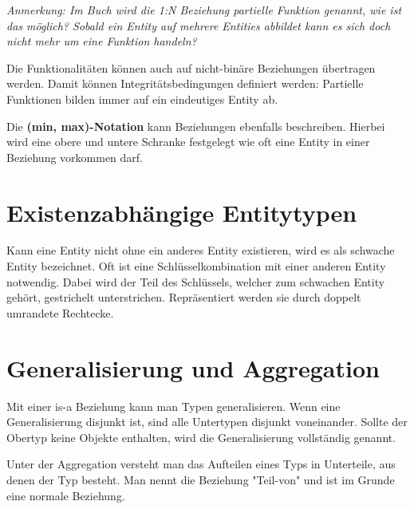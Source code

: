 \documentclass[a4paper, oneside]{book}
\begin{document}
  \textit{Anmerkung: Im Buch wird die 1:N Beziehung partielle Funktion genannt, wie ist das möglich?
  Sobald ein Entity auf mehrere Entities abbildet kann es sich doch nicht mehr um eine Funktion handeln?}

  Die Funktionalitäten können auch auf nicht-binäre Beziehungen übertragen werden. Damit können Integritätsbedingungen definiert werden:
  Partielle Funktionen bilden immer auf ein eindeutiges Entity ab.

  Die \textbf{(min, max)-Notation} kann Beziehungen ebenfalls beschreiben.
  Hierbei wird eine obere und untere Schranke festgelegt wie oft eine Entity in einer Beziehung vorkommen darf.
  
  \section{Existenzabhängige Entitytypen}
  Kann eine Entity nicht ohne ein anderes Entity existieren, wird es als schwache Entity bezeichnet.
  Oft ist eine Schlüsselkombination mit einer anderen Entity notwendig. Dabei wird der Teil des Schlüssels, welcher zum schwachen Entity gehört, 
  gestrichelt unterstrichen. Repräsentiert werden sie durch doppelt umrandete Rechtecke.

  \section{Generalisierung und Aggregation}
  Mit einer is-a Beziehung kann man Typen generalisieren. Wenn eine Generalisierung disjunkt ist, sind alle Untertypen disjunkt voneinander. 
  Sollte der Obertyp keine Objekte enthalten, wird die Generalisierung vollständig genannt.

  Unter der Aggregation versteht man das Aufteilen eines Typs in Unterteile, aus denen der Typ besteht. Man nennt die Beziehung "Teil-von" 
  und ist im Grunde eine normale Beziehung.
\end{document}
